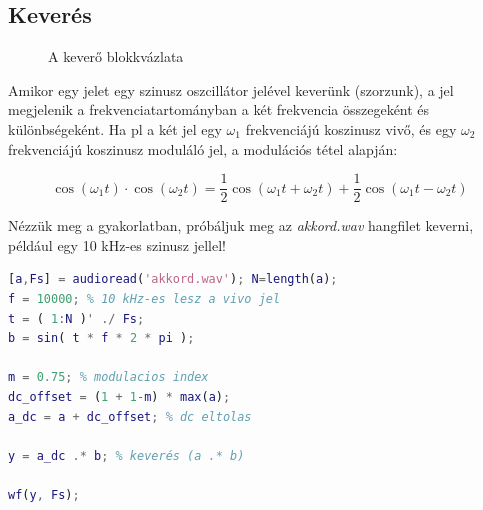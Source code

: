 \documentclass[12pt,a4paper]{article}
\begin{document}
\clearpage

\subsection{Keverés}


\begin{figure}[H]
\label{fig:keverok}
\centering
{}
\caption{
A keverő blokkvázlata} 
\end{figure}

Amikor egy jelet egy szinusz oszcillátor jelével keverünk (szorzunk), a jel megjelenik a frekvenciatartományban a két frekvencia összegeként és különbségeként. Ha pl a két jel egy $\omega_1$ frekvenciájú koszinusz vivő, és egy $\omega_2$ frekvenciájú koszinusz moduláló jel, a modulációs tétel alapján:

\begin{equation}
\cos(\omega_1t) \cdot \cos(\omega_2t) = \frac{1}{2}\cos(\omega_1t+\omega_2t) +  \frac{1}{2}\cos(\omega_1t - \omega_2t)
\end{equation}

Nézzük meg a gyakorlatban, próbáljuk meg az \textit{akkord.wav} hangfilet keverni, például egy 10 kHz-es szinusz jellel!


\begin{lstlisting}[frame=single,language=matlab,caption=Keverés]
[a,Fs] = audioread('akkord.wav'); N=length(a);
f = 10000; % 10 kHz-es lesz a vivo jel
t = ( 1:N )' ./ Fs;
b = sin( t * f * 2 * pi );

m = 0.75; % modulacios index
dc_offset = (1 + 1-m) * max(a);
a_dc = a + dc_offset; % dc eltolas

y = a_dc .* b; % keverés (a .* b)

wf(y, Fs);
\end{lstlisting}
\end{document}
